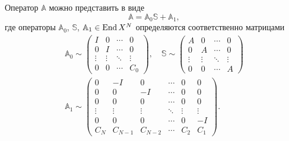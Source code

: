 Оператор $\mathbb A$ можно представить в виде
\[ \mathbb A = \mathbb A_0 \mathbb S + \mathbb A_1, \]
где операторы $\mathbb A_0$, $\mathbb S$, $\mathbb A_1 \in \operatorname{End} X^N$ определяются соответственно матрицами
\begin{gather*}
    \mathbb A_0 \sim \begin{pmatrix}
    I & 0 & \cdots &  0 \\
    0 & I  & \cdots &  0 \\
    \vdots & \vdots & \ddots &  \vdots \\
    0 & 0 & \cdots &  C_0
   \end{pmatrix}, \quad
   \mathbb S \sim \begin{pmatrix}
    A & 0 & \cdots &  0 \\
    0 & A  & \cdots &  0 \\
    \vdots & \vdots & \ddots &  \vdots \\
    0 & 0 & \cdots & A
   \end{pmatrix} \\
   \mathbb A_1 \sim \begin{pmatrix}
    0 & -I & 0  & \cdots & 0 & 0 \\
    0 & 0  & -I & \cdots & 0 & 0 \\
    0 & 0  & 0 & \cdots & 0 & 0 \\
    \vdots & \vdots & \vdots & \ddots & \vdots & \vdots \\
    0 & 0 & 0 & \cdots & 0 & -I \\
    C_N & C_{N-1} & C_{N-2} & \cdots & C_2 & C_1
   \end{pmatrix}.
\end{gather*}

